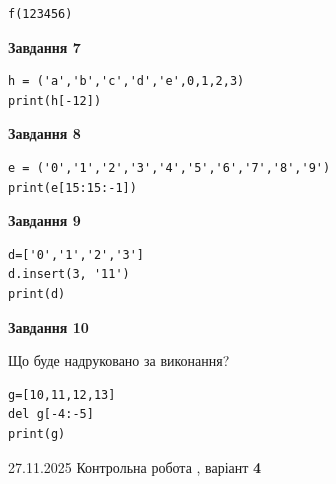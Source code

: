 \documentclass[12pt, ukrainian]{article}
\begin{document}
{{{{\begin{minipage}[t]{10.5cm}
\begin{verbatim}
f(123456)
\end{verbatim}



\begin{center}
\textbf{Завдання 7}
\end{center}

\begin{verbatim}
h = ('a','b','c','d','e',0,1,2,3)
print(h[-12])
\end{verbatim}



\begin{center}
\textbf{Завдання 8}
\end{center}

\begin{verbatim}
e = ('0','1','2','3','4','5','6','7','8','9')
print(e[15:15:-1])
\end{verbatim}



\begin{center}
\textbf{Завдання 9}
\end{center}

\begin{verbatim}
d=['0','1','2','3']
d.insert(3, '11')
print(d)
\end{verbatim}



\begin{center}
\textbf{Завдання 10}
\end{center}
Що буде надруковано за виконання?\par
\begin{verbatim}
g=[10,11,12,13]
del g[-4:-5]
print(g)
\end{verbatim}

\end{minipage}

}
\newpage

{{ 27.11.2025 Контрольна робота , варіант  \No \textbf { 4 }\par}}
{

{%



}}}}}
\end{document}
